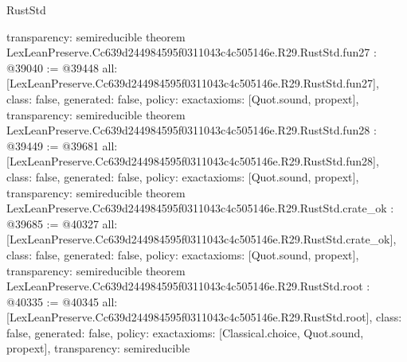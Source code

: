 \begin{lexlean}{RustStd}
\begin{coremodule}
{  transparency: semireducible
}
theorem LexLeanPreserve.Cc639d244984595f0311043c4c505146e.R29.RustStd.fun27 : @39040 := @39448 {
  all: [LexLeanPreserve.Cc639d244984595f0311043c4c505146e.R29.RustStd.fun27],
  class: false,
  generated: false,
  policy: exact{axioms: [Quot.sound, propext]},
  transparency: semireducible
}
theorem LexLeanPreserve.Cc639d244984595f0311043c4c505146e.R29.RustStd.fun28 : @39449 := @39681 {
  all: [LexLeanPreserve.Cc639d244984595f0311043c4c505146e.R29.RustStd.fun28],
  class: false,
  generated: false,
  policy: exact{axioms: [Quot.sound, propext]},
  transparency: semireducible
}
theorem LexLeanPreserve.Cc639d244984595f0311043c4c505146e.R29.RustStd.crate_ok : @39685 := @40327 {
  all: [LexLeanPreserve.Cc639d244984595f0311043c4c505146e.R29.RustStd.crate_ok],
  class: false,
  generated: false,
  policy: exact{axioms: [Quot.sound, propext]},
  transparency: semireducible
}
theorem LexLeanPreserve.Cc639d244984595f0311043c4c505146e.R29.RustStd.root : @40335 := @40345 {
  all: [LexLeanPreserve.Cc639d244984595f0311043c4c505146e.R29.RustStd.root],
  class: false,
  generated: false,
  policy: exact{axioms: [Classical.choice, Quot.sound, propext]},
  transparency: semireducible
}


\end{coremodule}
\end{lexlean}
